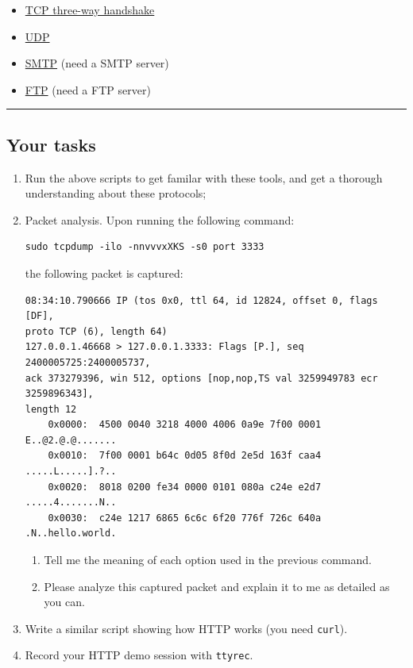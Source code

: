 \documentclass{article}
\begin{document}
\begin{itemize}
\item \href{https://cs6.swfu.edu.cn/\~wx672/lecture\_notes/network\_basics/scripts/tmux-demo-3way.handshake.sh}{TCP three-way handshake}
\item \href{https://cs6.swfu.edu.cn/\~wx672/lecture\_notes/network\_basics/scripts/tmux-demo-udp.sh}{UDP}
\item \href{https://cs6.swfu.edu.cn/\~wx672/lecture\_notes/network\_basics/scripts/tmux-demo-smtp.sh}{SMTP} (need a SMTP server)
\item \href{https://cs6.swfu.edu.cn/\~wx672/lecture\_notes/network\_basics/scripts/tmux-demo-ftp.sh}{FTP} (need a FTP server)
\end{itemize}

\noindent\rule{\textwidth}{0.5pt}
\subsection{Your tasks}
\label{sec:org6fc086e}

\begin{enumerate}
\item Run the above scripts to get familar with these tools, and get a thorough understanding about these protocols;

\item Packet analysis. Upon running the following command:

\begin{verbatim}
sudo tcpdump -ilo -nnvvvxXKS -s0 port 3333
\end{verbatim}

the following packet is captured:

\begin{verbatim}
08:34:10.790666 IP (tos 0x0, ttl 64, id 12824, offset 0, flags [DF],
proto TCP (6), length 64)
127.0.0.1.46668 > 127.0.0.1.3333: Flags [P.], seq 2400005725:2400005737,
ack 373279396, win 512, options [nop,nop,TS val 3259949783 ecr 3259896343],
length 12
    0x0000:  4500 0040 3218 4000 4006 0a9e 7f00 0001  E..@2.@.@.......
    0x0010:  7f00 0001 b64c 0d05 8f0d 2e5d 163f caa4  .....L.....].?..
    0x0020:  8018 0200 fe34 0000 0101 080a c24e e2d7  .....4.......N..
    0x0030:  c24e 1217 6865 6c6c 6f20 776f 726c 640a  .N..hello.world.
\end{verbatim}

\begin{enumerate}
\item Tell me the meaning of each option used in the previous command.

\item Please analyze this captured packet and explain it to me as detailed as you can.
\end{enumerate}

\item Write a similar script showing how HTTP works (you need \texttt{curl}).

\item Record your HTTP demo session with \texttt{ttyrec}.
\end{enumerate}
\end{document}
